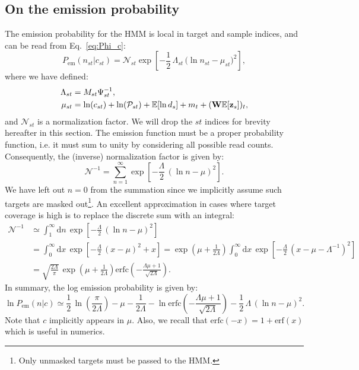 \documentclass[nofootinbib,amssymb,amsmath]{revtex4}
\newcommand{\vz}{{\bf z}}
\newcommand{\vW}{{\bf W}}
\newcommand{\PP}{\mathcal{P}}
\newcommand{\EE}{\mathbb{E}}
\begin{document}
\subsection{On the emission probability}
The emission probability for the HMM is local in target and sample indices, and can be read from Eq.~\eqref{eq:Phi_c}:
\begin{equation}
P_\mathrm{em}(n_{st}|c_{st}) = \mathcal{N}_{st} \exp\left[- \frac{1}{2} \, \Lambda_{st} \, \big(\ln n_{st} - \mu_{st}\big)^2\right],
\end{equation}
where we have defined:
\begin{align}
\Lambda_{st} &= M_{st}\Psi_{st}^{-1},\nonumber\\
\mu_{st} &= \ln(c_{st}) + \ln(\PP_{st}) + \EE[\ln d_s] + m_t + (\vW \EE[\vz_s])_t,
\end{align}
and $\mathcal{N}_{st}$ is a normalization factor. We will drop the $st$ indices for brevity hereafter in this section. The emission function must be a proper probability function, i.e. it must sum to unity by considering all possible read counts. Consequently, the (inverse) normalization factor is given by:
\begin{equation}
\mathcal{N}^{-1} = \sum_{n=1}^\infty \exp\left[-\frac{\Lambda}{2}\,(\ln n - \mu)^2\right].
\end{equation}
We have left out $n=0$ from the summation since we implicitly assume such targets are masked out\footnote{Only unmasked targets must be passed to the HMM.}. An excellent approximation in cases where target coverage is high is to replace the discrete sum with an integral:
\begin{align}
\mathcal{N}^{-1} &\simeq \int_{1}^\infty \mathrm{d}n\,\exp\left[-\frac{\Lambda}{2}\,(\ln n - \mu)^2\right]\nonumber\\
&= \int_{0}^\infty \mathrm{d}x \, \exp\left[-\frac{\Lambda}{2}\,(x - \mu)^2 + x\right] = \exp\left(\mu + \frac{1}{2\Lambda}\right)\int_{0}^\infty \mathrm{d}x \, \exp\left[-\frac{\Lambda}{2}\,(x - \mu - \Lambda^{-1})^2\right]\nonumber\\
&= \sqrt{\frac{2\Lambda}{\pi}}\,\exp\left(\mu + \frac{1}{2\Lambda}\right) \mathrm{erfc}\left(-\frac{\Lambda \mu + 1}{\sqrt{2\Lambda}}\right).
\end{align}
In summary, the log emission probability is given by:
\begin{equation}
\ln P_{\mathrm{em}}(n|c) \simeq \frac{1}{2}\,\ln\left(\frac{\pi}{2\Lambda}\right) - \mu - \frac{1}{2\Lambda} - \ln \mathrm{erfc}\left(-\frac{\Lambda \mu + 1}{\sqrt{2\Lambda}}\right) - \frac{1}{2}\,\Lambda\,(\ln n - \mu)^2.
\end{equation}
Note that $c$ implicitly appears in $\mu$. Also, we recall that $\mathrm{erfc}(-x) = 1 + \mathrm{erf}(x)$ which is useful in numerics.
\end{document}

